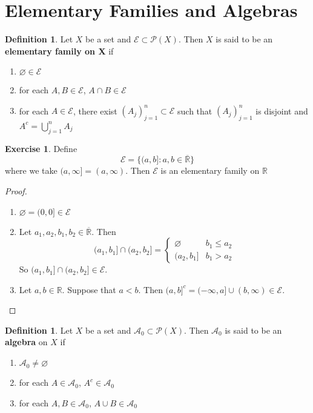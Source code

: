 \documentclass{book}
\theoremstyle{definition}
\newtheorem{defn}[definition]{Definition}
\newtheorem{ex}[definition]{Exercise}
\newcommand{\R}{\mathbb{R}}
\newcommand{\MA}{\mathcal{A}}
\newcommand{\ME}{\mathcal{E}}
\newcommand{\MP}{\mathcal{P}}
\newcommand{\lex}[1]{\label{ex:#1}}
\newcommand{\ld}[1]{\label{defn:#1}}
\DeclareMathOperator*{\0}{\mbf{0}}
\DeclareMathOperator*{\1}{\mbf{1}}
\begin{document}
	
	\section{Elementary Families and Algebras}
	
	\begin{defn} \ld{00000} 
		Let $X$ be a set and $\ME \subset \MP(X)$. Then $X$ is said to be an \textbf{elementary family on X} if 
		\begin{enumerate}
			\item $\varnothing \in \ME$
			\item for each $A, B \in \ME$, $A \cap B \in \ME$
			\item for each $A \in \ME$, there exist $(A_j)_{j=1}^n \subset \ME$ such that  $(A_j)_{j=1}^n $ is disjoint and $A^c = \bigcup\limits_{j=1}^n A_j$
		\end{enumerate}
	\end{defn}
	
	\begin{ex} \lex{00000} 
		Define $$\ME = \{(a,b]: a,b \in \overline{\R}\}$$ where we take $(a, \infty] = (a, \infty)$. Then $\ME$ is an elementary family on $\R$
	\end{ex}
	
	\begin{proof}\
		\begin{enumerate}
			\item $\varnothing = (0,0] \in \ME$
			\item Let $a_1, a_2, b_1, b_2 \in \overline{\R}$. Then 
			\[
			(a_1, b_1] \cap  (a_2, b_2] =
			\begin{cases}
				\varnothing  & b_1 \leq a_2 \\
				(a_2, b_1] & b_1 > a_2 
			\end{cases} 
			\]
			So $(a_1, b_1] \cap  (a_2, b_2] \in \ME$.
			\item Let $a, b \in \R$. Suppose that $a < b$. Then $(a,b]^c = (-\infty, a] \cup (b, \infty) \in \ME$. 
		\end{enumerate}
	\end{proof}
	
	\begin{defn} \ld{00000} 
		Let $X$ be a set and $\MA_0 \subset \MP(X)$. Then $\MA_0$ is said to be an \textbf{algebra} on $X$ if 
		\begin{enumerate}
			\item $\MA_0 \neq \varnothing$
			\item for each $A \in \MA_0$, $A^c \in \MA_0$
			\item for each $A,B \in \MA_0$, $A \cup B \in \MA_0$
		\end{enumerate}
	\end{defn}
	
\end{document}
